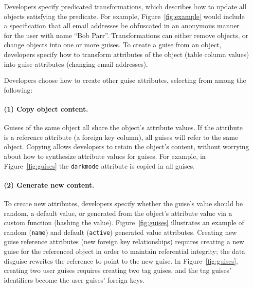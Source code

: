 Developers specify predicated transformations, which describes how to update all objects satisfying
the predicate. For example, Figure~\ref{fig:example} would include a specification that all email
addresses be obfuscated in an anonymous manner for the user with name ``Bob Parr''.
%
Transformations can either remove objects, or change objects into one or more guises.
To create a guise from an object, developers specify how to transform attributes of the
object (\eg table column values) into guise attributes (\eg changing email addresses).

\iffalse
Developers choose how to create other guise attributes, selecting from among the following:
%
\paragraph{(1) Copy object content.}
%
Guises of the same object all share the object's attribute values.
%
If the attribute is a reference attribute (\eg a foreign key column), all guises will refer to the same object.
%
%
Copying allows developers to retain the object's content, without worrying about how to
synthesize attribute values for guises.
%
For example, in Figure~\ref{fig:guises} the \texttt{darkmode} attribute is copied in
all guises.

\paragraph{(2) Generate new content.}
%
To create new attributes, developers specify whether the guise's value should be random,
a default value, or generated from the object's attribute value via a custom function (\eg hashing
the value).
%
Figure~\ref{fig:guises} illustrates an example of random (\texttt{name}) and default
(\texttt{active}) generated value attributes.
%
%
Creating new guise reference attributes (\eg new foreign key relationships) requires
creating a new guise for the referenced object in order to maintain referential
integrity;
the data disguise rewrites the reference to point to the new guise.
%
In Figure~\ref{fig:guises}, creating two user guises requires creating two
tag guises, and the tag guises' identifiers become the user guises' foreign keys.
%

